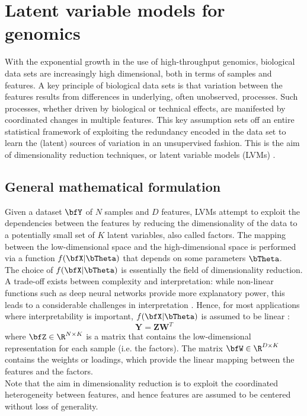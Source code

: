 \section{Latent variable models for genomics}
With the exponential growth in the use of high-throughput genomics, biological data sets are increasingly high dimensional, both in terms of samples and features. A key principle of biological data sets is that variation between the features results from differences in underlying, often unobserved, processes. Such processes, whether driven by biological or technical effects, are manifested by coordinated changes in multiple features. This key assumption sets off an entire statistical framework of exploiting the redundancy encoded in the data set to learn the (latent) sources of variation in an unsupervised fashion. This is the aim of dimensionality reduction techniques, or latent variable models (LVMs) \cite{Komili2008, Stegle2012, Leek2007, Pournara2007, Dai2017, Genevieve2018, Meng2016}.

\subsection{General mathematical formulation}
Given a dataset $\bfY$ of $N$ samples and $D$ features, LVMs attempt to exploit the dependencies between the features by reducing the dimensionality of the data to a potentially small set of $K$ latent variables, also called factors. The mapping between the low-dimensional space and the high-dimensional space is performed via a function $f(\bfX|\bTheta)$ that depends on some parameters $\bTheta$.\\

The choice of $f(\bfX|\bTheta)$ is essentially the field of dimensionality reduction. A trade-off exists between complexity and interpretation: while non-linear functions such as deep neural networks provide more explanatory power, this leads to a considerable challenges in interpretation \cite{Zhang2018_NN}. Hence, for most applications where interpretability is important, $f(\bfX|\bTheta)$ is assumed to be linear \cite{XX}:
\begin{equation} \label{eq:linear_model}
	\mathbf{Y} = \mathbf{Z}\mathbf{W}^{T}
\end{equation}
where $\bfZ \in \R^{N \times K}$ is a matrix that contains the low-dimensional representation for each sample (i.e. the factors). The matrix $\bfW \in \R^{D \times K}$ contains the weights or loadings, which provide the linear mapping between the features and the factors.\\
Note that the aim in dimensionality reduction is to exploit the coordinated heterogeneity between features, and hence features are assumed to be centered without loss of generality.\\

